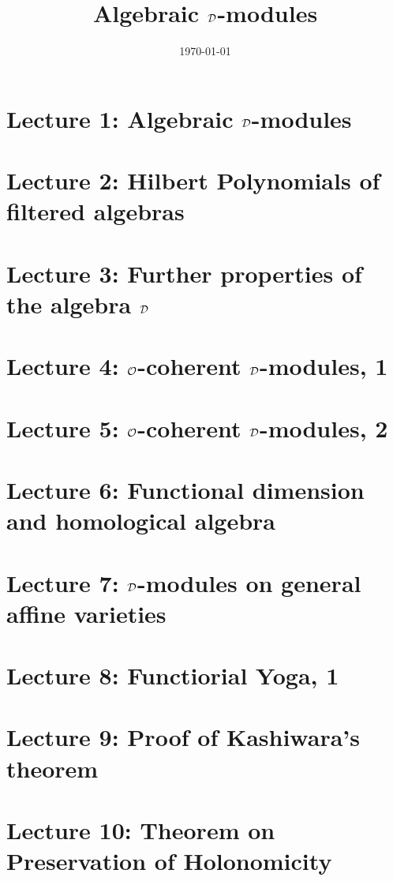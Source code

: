 \documentclass[12pt]{amsbook}
\title{Algebraic $\mathcal{D}$-modules}
\begin{document}
  
  
  \date{\today}
  \maketitle
  \tableofcontents
  \mbox{}
  
  \printnomenclature


\part{Lecture 1: Algebraic $\mathcal{D}$-modules}
\part{Lecture 2: Hilbert Polynomials of filtered algebras}
\part{Lecture 3: Further properties of the algebra $\mathcal{D}$}
\part{Lecture 4: $\mathcal{O}$-coherent $\mathcal{D}$-modules, 1}
\part{Lecture 5: $\mathcal{O}$-coherent $\mathcal{D}$-modules, 2}
\part{Lecture 6: Functional dimension and homological algebra}
\part{Lecture 7: $\mathcal{D}$-modules on general affine varieties}
\part{Lecture 8: Functiorial Yoga, 1}
\part{Lecture 9: Proof of Kashiwara's theorem}
\part{Lecture 10: Theorem on Preservation of Holonomicity}
\end{document}
